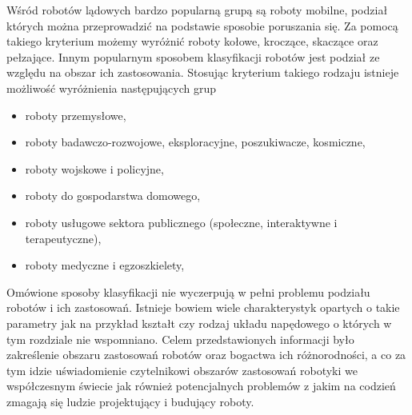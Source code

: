 Wśród robotów lądowych bardzo popularną grupą są roboty mobilne, podział których
można przeprowadzić na podstawie sposobie poruszania się. Za pomocą takiego
kryterium możemy wyróżnić roboty kołowe, kroczące, skaczące oraz pełzające.
Innym popularnym sposobem klasyfikacji robotów jest podział ze względu na 
obszar ich zastosowania. Stosując kryterium takiego rodzaju istnieje możliwość
wyróżnienia następujących grup
\begin{itemize}
  \item roboty przemysłowe,
  \item roboty badawczo-rozwojowe, eksploracyjne, poszukiwacze, kosmiczne,
  \item roboty wojskowe i policyjne,
  \item roboty do gospodarstwa domowego,
  \item roboty usługowe sektora publicznego (społeczne, interaktywne i
  terapeutyczne),
  \item roboty medyczne i egzoszkielety,
\end{itemize}
Omówione sposoby klasyfikacji nie wyczerpują w pełni problemu podziału
robotów i ich zastosowań. Istnieje bowiem wiele charakterystyk opartych o takie
parametry jak na przykład kształt czy rodzaj układu napędowego o których w tym
rozdziale nie wspomniano. Celem przedstawionych informacji było zakreślenie
obszaru zastosowań robotów oraz bogactwa ich różnorodności, a co za tym idzie
uświadomienie czytelnikowi obszarów zastosowań robotyki we współczesnym świecie
jak również potencjalnych problemów z jakim na codzień zmagają się ludzie
projektujący i budujący roboty.
